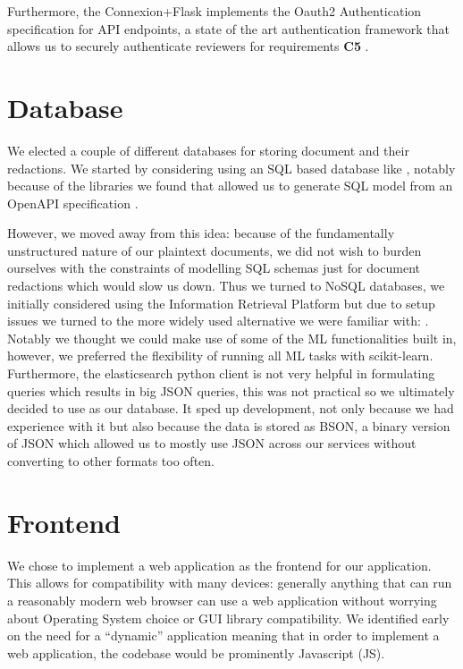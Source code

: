 \documentclass[\version]{l4proj}
\begin{document}
Furthermore, the Connexion+Flask implements the Oauth2 Authentication specification for API endpoints, a state of the art authentication framework that allows us to securely authenticate reviewers for requirements \textbf{C5} \autocite{jonesOAuthAuthorizationFramework2012}.

\section{Database}

We elected a couple of different databases for storing document and their redactions.
We started by considering using an SQL based database like \textcite{Postgres2020}, notably because of the libraries we found that allowed us to generate SQL model from an OpenAPI specification \autocite{jdkanderssonJdkanderssonOpenAlchemy2020}.

However, we moved away from this idea: because of the fundamentally unstructured nature of our plaintext documents, we did not wish to burden ourselves with the constraints of modelling SQL schemas just for document redactions which would slow us down.
Thus we turned to NoSQL databases, we initially considered using the \textcite{Terrier2020} Information Retrieval Platform but due to setup issues we turned to the more widely used alternative we were familiar with: \textcite{ElasticElasticsearch2020}.
Notably we thought we could make use of some of the ML functionalities built in, however, we preferred the flexibility of running all ML tasks with scikit-learn.
Furthermore, the elasticsearch python client is not very helpful in formulating queries which results in big JSON queries, this was not practical so we ultimately decided to use \textcite{MongoDB2020} as our database.
It sped up development, not only because we had experience with it but also because the data is stored as BSON, a binary version of JSON which allowed us to mostly use JSON across our services without converting to other formats too often.

\section{Frontend}

We chose to implement a web application as the frontend for our application.
This allows for compatibility with many devices: generally anything that can run a reasonably modern web browser can use a web application without worrying about Operating System choice or GUI library compatibility.
We identified early on the need for a ``dynamic'' application meaning that in order to implement a web application, the codebase would be prominently Javascript (JS).
\end{document}
